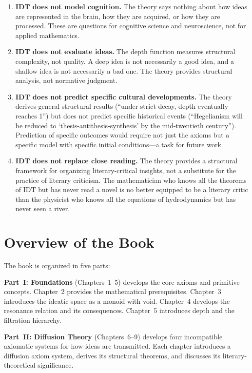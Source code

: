 \documentclass[11pt,openany]{book}
\theoremstyle{definition}
\theoremstyle{plain}
\theoremstyle{remark}
\begin{document}
\begin{enumerate}
\item \textbf{IDT does not model cognition.} The theory says nothing about how ideas are represented in the brain, how they are acquired, or how they are processed. These are questions for cognitive science and neuroscience, not for applied mathematics.

\item \textbf{IDT does not evaluate ideas.} The depth function measures structural complexity, not quality. A deep idea is not necessarily a good idea, and a shallow idea is not necessarily a bad one. The theory provides structural analysis, not normative judgment.

\item \textbf{IDT does not predict specific cultural developments.} The theory derives general structural results (``under strict decay, depth eventually reaches 1'') but does not predict specific historical events (``Hegelianism will be reduced to `thesis-antithesis-synthesis' by the mid-twentieth century''). Prediction of specific outcomes would require not just the axioms but a specific model with specific initial conditions---a task for future work.

\item \textbf{IDT does not replace close reading.} The theory provides a structural framework for organizing literary-critical insights, not a substitute for the practice of literary criticism. The mathematician who knows all the theorems of IDT but has never read a novel is no better equipped to be a literary critic than the physicist who knows all the equations of hydrodynamics but has never seen a river.
\end{enumerate}

\section{Overview of the Book}

The book is organized in five parts:

\textbf{Part~I: Foundations} (Chapters~1--5) develops the core axioms and primitive concepts. Chapter~2 provides the mathematical prerequisites. Chapter~3 introduces the ideatic space as a monoid with void. Chapter~4 develops the resonance relation and its consequences. Chapter~5 introduces depth and the filtration hierarchy.

\textbf{Part~II: Diffusion Theory} (Chapters~6--9) develops four incompatible axiomatic systems for how ideas are transmitted. Each chapter introduces a diffusion axiom system, derives its structural theorems, and discusses its literary-theoretical significance.
\end{document}
